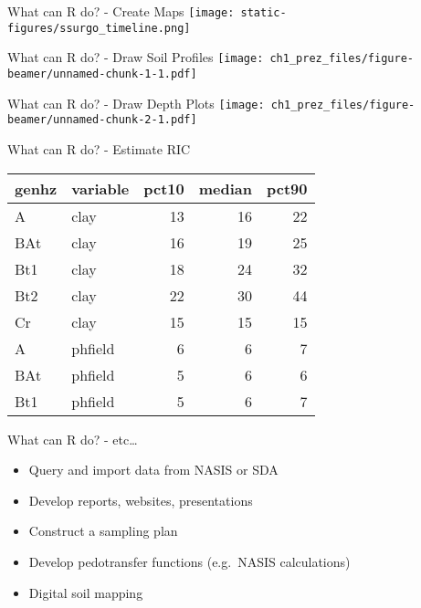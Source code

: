 \documentclass[
  ignorenonframetext,
]{beamer}
\providecommand{\tightlist}{%
  \setlength{\itemsep}{0pt}\setlength{\parskip}{0pt}}
\begin{document}
\begin{frame}{What can R do? - Create Maps}
\protect\hypertarget{what-can-r-do---create-maps}{}
\texttt{[image: static-figures/ssurgo\_timeline.png]}
\end{frame}

\begin{frame}{What can R do? - Draw Soil Profiles}
\protect\hypertarget{what-can-r-do---draw-soil-profiles}{}
\texttt{[image: ch1\_prez\_files/figure-beamer/unnamed-chunk-1-1.pdf]}
\end{frame}

\begin{frame}{What can R do? - Draw Depth Plots}
\protect\hypertarget{what-can-r-do---draw-depth-plots}{}
\texttt{[image: ch1\_prez\_files/figure-beamer/unnamed-chunk-2-1.pdf]}
\end{frame}

\begin{frame}{What can R do? - Estimate RIC}
\protect\hypertarget{what-can-r-do---estimate-ric}{}
\begin{longtable}[]{@{}llrrr@{}}
\toprule
genhz & variable & pct10 & median & pct90 \\
\midrule
\endhead
A & clay & 13 & 16 & 22 \\
BAt & clay & 16 & 19 & 25 \\
Bt1 & clay & 18 & 24 & 32 \\
Bt2 & clay & 22 & 30 & 44 \\
Cr & clay & 15 & 15 & 15 \\
A & phfield & 6 & 6 & 7 \\
BAt & phfield & 5 & 6 & 6 \\
Bt1 & phfield & 5 & 6 & 7 \\
\bottomrule
\end{longtable}
\end{frame}

\begin{frame}{What can R do? - etc\ldots{}}
\protect\hypertarget{what-can-r-do---etc}{}
\begin{itemize}
\tightlist
\item
  Query and import data from NASIS or SDA
\item
  Develop reports, websites, presentations
\item
  Construct a sampling plan
\item
  Develop pedotransfer functions (e.g.~NASIS calculations)
\item
  Digital soil mapping
\end{itemize}
\end{frame}
\end{document}
